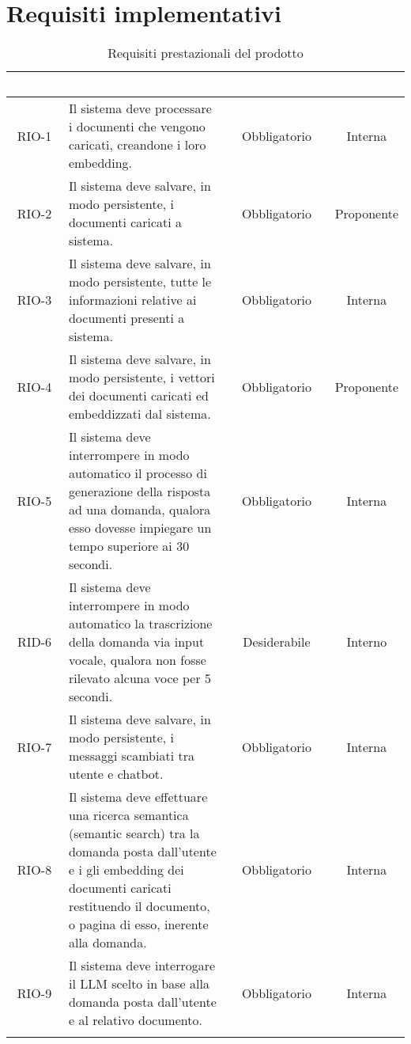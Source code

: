 \section{Requisiti implementativi}
\begingroup
\setlength{\tabcolsep}{10pt}
\renewcommand{\arraystretch}{1.5}
\begin{xltabular}{\textwidth}{| c | X | c | c |}
    \hline
     \textbf{\textcolor{white}{Codice}} & \textbf{\textcolor{white}{Descrizione}} & \textbf{\textcolor{white}{Classificazione}} & \textbf{\textcolor{white}{Fonte}}\\
    \hline
    \endhead
    RIO-1 & Il sistema deve processare i documenti che vengono caricati, creandone i loro embedding. & Obbligatorio & Interna\\
    \hline
    RIO-2 & Il sistema deve salvare, in modo persistente, i documenti caricati a sistema. & Obbligatorio & Proponente\\
    \hline
    RIO-3 & Il sistema deve salvare, in modo persistente, tutte le informazioni relative ai documenti presenti a sistema. & Obbligatorio & Interna\\
    \hline
    RIO-4 & Il sistema deve salvare, in modo persistente, i vettori dei documenti caricati ed embeddizzati dal sistema. & Obbligatorio & Proponente\\
    \hline
    RIO-5 & Il sistema deve interrompere in modo automatico il processo di generazione della risposta ad una domanda, qualora esso dovesse impiegare un tempo superiore ai 30 secondi. & Obbligatorio & Interna\\
    \hline
    RID-6 & Il sistema deve interrompere in modo automatico la trascrizione della domanda via input vocale, qualora non fosse rilevato alcuna voce per 5 secondi. & Desiderabile & Interno\\
    \hline
    RIO-7 & Il sistema deve salvare, in modo persistente, i messaggi scambiati tra utente e chatbot. & Obbligatorio & Interna\\
    \hline
    RIO-8 & Il sistema deve effettuare una ricerca semantica (semantic search) tra la domanda posta dall'utente e i gli embedding dei documenti caricati restituendo il documento, o pagina di esso, inerente alla domanda. & Obbligatorio & Interna\\
    \hline
    RIO-9 & Il sistema deve interrogare il LLM scelto in base alla domanda posta dall'utente e al relativo documento. & Obbligatorio & Interna\\
    \hline
     \caption{Requisiti prestazionali del prodotto}
    \label{tab:reqimp}
\end{xltabular}
\endgroup

